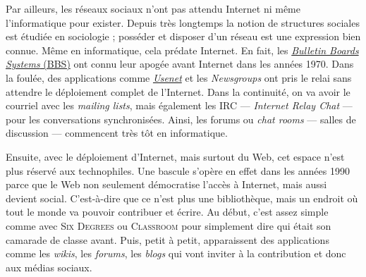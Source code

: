
Par ailleurs, les réseaux sociaux n'ont pas attendu Internet ni même l'informatique pour exister. Depuis très longtemps la notion de structures sociales est étudiée en sociologie ; posséder et disposer d'un réseau est une expression bien connue.
Même en informatique, cela prédate Internet. En fait, les \href{https://fr.wikipedia.org/wiki/Bulletin_board_system}{\textit{Bulletin Boards Systems} (BBS)} ont connu leur apogée avant Internet dans les années 1970. Dans la foulée, des applications comme \href{https://fr.wikipedia.org/wiki/Usenet}{\textit{Usenet}} et les \textit{Newsgroups} ont pris le relai sans attendre le déploiement complet de l'Internet. Dans la continuité, on va avoir le courriel avec les \textit{mailing lists}, mais également les IRC --- \textit{Internet Relay Chat} --- pour les conversations synchronisées. Ainsi, les forums ou \textit{chat rooms} --- salles de discussion --- commencent très tôt en informatique.

Ensuite, avec le déploiement d'Internet, mais surtout du Web, cet espace n'est plus réservé aux technophiles. 
Une bascule s'opère en effet dans les années 1990 parce que le Web non seulement démocratise l'accès à Internet, mais aussi devient social. C'est-à-dire que ce n'est plus une bibliothèque, mais un endroit où tout le monde va pouvoir contribuer et écrire. 
Au début, c'est assez simple comme avec \textsc{Six Degrees} ou \textsc{Classroom} pour simplement dire qui était son camarade de classe avant. Puis, petit à petit, apparaissent des applications comme les \textit{wikis}, les \textit{forums}, les \textit{blogs} qui vont inviter à la contribution et donc aux médias sociaux.  


